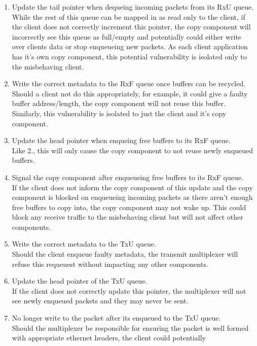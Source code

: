 \begin{enumerate}
    \item Update the tail pointer when dequeing incoming packets from its RxU queue.\\
    While the rest of this queue can be mapped in as read only to the client, if the client does not correctly increment this pointer,
    the copy component will incorrectly see this queue as full/empty and potentially could either write over clients data or stop
    enqueueing new packets. As each client application has it's own copy component, this potential vulnerability is isolated only to
    the misbehaving client.
    \item Write the correct metadata to the RxF queue once buffers can be recycled.\\ 
    Should a client not do this appropriately, for example, it could give a faulty buffer address/length, the copy component will not 
    reuse this buffer. Similarly, this vulnerability is isolated to just the client and it's copy component.
    \item Update the head pointer when enqueing free buffers to its RxF queue.\\
    Like 2., this will only cause the copy component to not reuse newly enqueued buffers.
    \item Signal the copy component after enqueueing free buffers to its RxF queue.\\
    If the client does not inform the copy component of this update and the copy component is blocked on enqueueing incoming packets as there
    aren't enough free buffers to copy into, the copy component may not wake up. This could block any receive traffic to the misbehaving client
    but will not affect other components.
    \item Write the correct metadata to the TxU queue.\\
    Should the client enqueue faulty metadata, the transmit multiplexer will refuse this requeuest without impacting any other components.
    \item Update the head pointer of the TxU queue.\\
    If the client does not correctly update this pointer, the multiplexer will not see newly enqueued packets and they may never be sent.
    \item No longer write to the packet after its enqueued to the TxU queue.\\
    Should the multiplexer be responsible for ensuring the packet is well formed with appropriate ethernet headers, the client could potentially

\end{enumerate}
